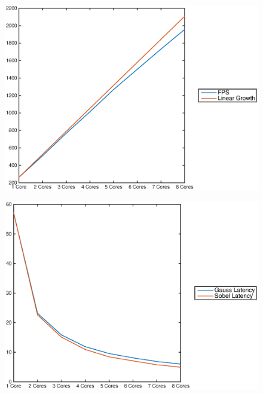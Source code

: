 \begin{figure}
    \centering
    \begin{minipage}{0.45\textwidth}
        \centering
        \includegraphics[width=0.99\linewidth]{images/coremask_fps.eps}
    \end{minipage}
    \hfill
    \begin{minipage}{0.45\textwidth}
        \centering
        \includegraphics[width=0.99\linewidth]{images/coremask_latencies.eps}
        \label{fig:latencyvcores}
    \end{minipage}%
\end{figure}

